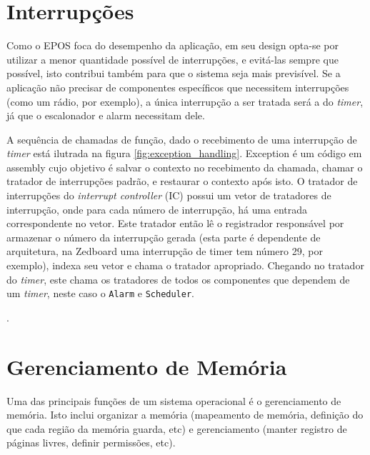 \section{Interrupções}


Como o EPOS foca do desempenho da aplicação, em seu design opta-se por utilizar a menor quantidade possível de interrupções, e evitá-las sempre que possível, isto contribui também para que o sistema seja mais previsível. Se a aplicação não precisar de componentes específicos que necessitem interrupções (como um rádio, por exemplo), a única interrupção a ser tratada será a do \emph{timer}, já que o escalonador e alarm necessitam dele.


A sequência de chamadas de função, dado o recebimento de uma interrupção de \emph{timer} está ilutrada na figura \ref{fig:exception_handling}. Exception é um código em assembly cujo objetivo é salvar o contexto no recebimento da chamada, chamar o tratador de interrupções padrão, e restaurar o contexto após isto. O tratador de interrupções do \emph{interrupt controller} (IC) possui um vetor de tratadores de interrupção, onde para cada número de interrupção, há uma entrada correspondente no vetor. Este tratador então lê o registrador responsável por armazenar o número da interrupção gerada (esta parte é dependente de arquitetura, na Zedboard uma interrupção de timer tem número 29, por exemplo), indexa seu vetor e chama o tratador apropriado. Chegando no tratador do \emph{timer}, este chama os tratadores de todos os componentes que dependem de um \emph{timer}, neste caso o \verb+Alarm+ e \verb+Scheduler+.

. 



\section{Gerenciamento de Memória}
\label{sec:gerenciamento}
Uma das principais funções de um sistema operacional é o gerenciamento de memória. Isto inclui organizar a memória (mapeamento de memória, definição do que cada região da memória guarda, etc) e gerenciamento (manter registro de páginas livres, definir permissões, etc).

